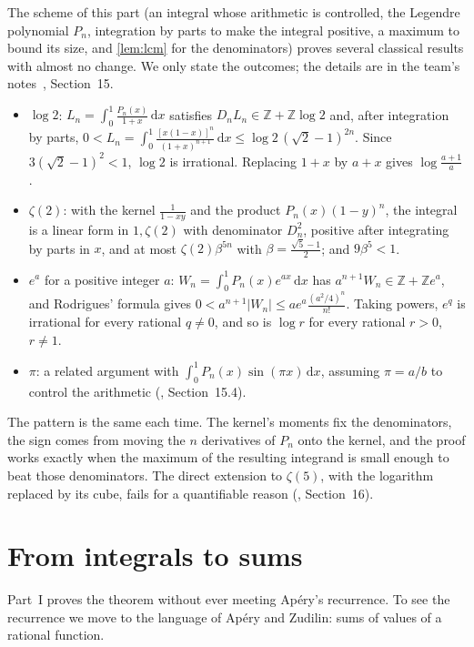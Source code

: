 \documentclass[11pt]{article}
\newcommand{\Z}{\mathbb{Z}}
\newcommand{\dd}{\,\mathrm{d}}
\newcommand{\Dn}{D_n}
\theoremstyle{plain}
\theoremstyle{definition}
\theoremstyle{remark}
\begin{document}
The scheme of this part (an integral whose arithmetic is controlled, the Legendre polynomial $P_n$,
integration by parts to make the integral positive, a maximum to bound its size, and
\cref{lem:lcm} for the denominators) proves several classical results with almost no change. We
only state the outcomes; the details are in the team's notes~\cite{codexnotes}, Section~15.
\begin{itemize}
  \item $\log2$: $L_n=\int_0^1\frac{P_n(x)}{1+x}\dd x$ satisfies $\Dn L_n\in\Z+\Z\log2$ and, after
    integration by parts, $0<L_n=\int_0^1\frac{[x(1-x)]^n}{(1+x)^{n+1}}\dd x\le\log2\,(\sqrt2-1)^{2n}$.
    Since $3(\sqrt2-1)^2<1$, $\log 2$ is irrational. Replacing $1+x$ by $a+x$ gives $\log\frac{a+1}a$.
  \item $\zeta(2)$: with the kernel $\frac1{1-xy}$ and the product $P_n(x)(1-y)^n$, the integral is a
    linear form in $1,\zeta(2)$ with denominator $\Dn^2$, positive after integrating by parts in $x$,
    and at most $\zeta(2)\beta^{5n}$ with $\beta=\frac{\sqrt5-1}2$; and $9\beta^5<1$.
  \item $e^a$ for a positive integer $a$: $W_n=\int_0^1P_n(x)e^{ax}\dd x$ has $a^{n+1}W_n\in\Z+\Z e^a$,
    and Rodrigues' formula gives $0<a^{n+1}|W_n|\le ae^a\frac{(a^2/4)^n}{n!}$. Taking powers, $e^q$
    is irrational for every rational $q\ne0$, and so is $\log r$ for every rational $r>0$, $r\ne1$.
  \item $\pi$: a related argument with $\int_0^1P_n(x)\sin(\pi x)\dd x$, assuming $\pi=a/b$ to control
    the arithmetic (\cite{codexnotes}, Section~15.4).
\end{itemize}
The pattern is the same each time. The kernel's moments fix the denominators, the sign comes from
moving the $n$ derivatives of $P_n$ onto the kernel, and the proof works exactly when the
maximum of the resulting integrand is small enough to beat those denominators. The direct extension to $\zeta(5)$, with
the logarithm replaced by its cube, fails for a quantifiable reason (\cite{codexnotes}, Section~16).

\part{From integrals to sums}\label{part:sums}

Part~I proves the theorem without ever meeting Ap\'ery's recurrence. To see the recurrence we move
to the language of Ap\'ery and Zudilin: sums of values of a rational function.
\end{document}
